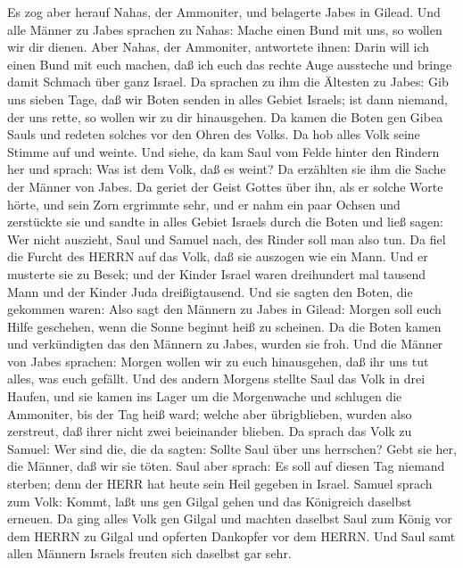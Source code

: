  Es zog aber herauf Nahas, der Ammoniter, und belagerte
Jabes in Gilead. Und alle Männer zu Jabes sprachen zu Nahas: Mache einen
Bund mit uns, so wollen wir dir dienen.  Aber Nahas, der
Ammoniter, antwortete ihnen: Darin will ich einen Bund mit euch machen,
daß ich euch das rechte Auge aussteche und bringe damit Schmach über
ganz Israel.  Da sprachen zu ihm die Ältesten zu Jabes: Gib
uns sieben Tage, daß wir Boten senden in alles Gebiet Israels; ist dann
niemand, der uns rette, so wollen wir zu dir hinausgehen. 
Da kamen die Boten gen Gibea Sauls und redeten solches vor den Ohren des
Volks. Da hob alles Volk seine Stimme auf und weinte.  Und
siehe, da kam Saul vom Felde hinter den Rindern her und sprach: Was ist
dem Volk, daß es weint? Da erzählten sie ihm die Sache der Männer von
Jabes.  Da geriet der Geist Gottes über ihn, als er solche
Worte hörte, und sein Zorn ergrimmte sehr,  und er nahm ein
paar Ochsen und zerstückte sie und sandte in alles Gebiet Israels durch
die Boten und ließ sagen: Wer nicht auszieht, Saul und Samuel nach, des
Rinder soll man also tun. Da fiel die Furcht des HERRN auf das Volk, daß
sie auszogen wie ein Mann.  Und er musterte sie zu Besek;
und der Kinder Israel waren dreihundert mal tausend Mann und der Kinder
Juda dreißigtausend.  Und sie sagten den Boten, die gekommen
waren: Also sagt den Männern zu Jabes in Gilead: Morgen soll euch Hilfe
geschehen, wenn die Sonne beginnt heiß zu scheinen. Da die Boten kamen
und verkündigten das den Männern zu Jabes, wurden sie froh.
 Und die Männer von Jabes sprachen: Morgen wollen wir zu
euch hinausgehen, daß ihr uns tut alles, was euch gefällt. 
Und des andern Morgens stellte Saul das Volk in drei Haufen, und sie
kamen ins Lager um die Morgenwache und schlugen die Ammoniter, bis der
Tag heiß ward; welche aber übrigblieben, wurden also zerstreut, daß
ihrer nicht zwei beieinander blieben.  Da sprach das Volk
zu Samuel: Wer sind die, die da sagten: Sollte Saul über uns herrschen?
Gebt sie her, die Männer, daß wir sie töten.  Saul aber
sprach: Es soll auf diesen Tag niemand sterben; denn der HERR hat heute
sein Heil gegeben in Israel.  Samuel sprach zum Volk:
Kommt, laßt uns gen Gilgal gehen und das Königreich daselbst erneuen.
 Da ging alles Volk gen Gilgal und machten daselbst Saul
zum König vor dem HERRN zu Gilgal und opferten Dankopfer vor dem HERRN.
Und Saul samt allen Männern Israels freuten sich daselbst gar sehr.

